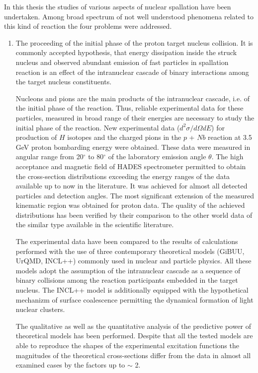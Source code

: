 In this thesis the studies of various aspects of nuclear spallation
have been undertaken. Among broad spectrum of not well understood
phenomena related to this kind of reaction the four problems were
addressed.

\begin{enumerate}
\item The proceeding of the initial phase of the proton target nucleus collision.
It is commonly accepted hypothesis, that energy dissipation inside
the struck nucleus and observed abundant emission of fast particles
in spallation reaction is an effect of the intranuclear cascade of
binary interactions among the target nucleus constituents.

\vspace{0.3cm}

Nucleons and pions are the main products of the intranuclear
cascade, i.e. of the initial phase of the reaction. Thus, reliable
experimental data for these particles, measured in broad range of
their energies  are necessary to study the initial phase of the
reaction. New experimental data ($d^2\sigma/d\Omega dE$) for
production of $H$ isotopes and the charged pions in the $p$ + $Nb$
reaction at 3.5 GeV proton bombarding energy were obtained. These
data were measured in angular range from 20$^{\circ}$ to
80$^{\circ}$ of the laboratory emission angle $\theta$. The high
acceptance and magnetic field of HADES spectrometer permitted to
obtain the cross-section distributions exceeding the energy ranges
of the data available up to now in the literature. It was achieved
for almost all detected particles and detection angles. The most
significant extension of the measured kinematic region was obtained
for proton data.
%
The quality of the achieved distributions has been verified by their
comparison to the other world data of the similar type available in
the scientific literature.

The experimental data have been compared to the results of
calculations performed with the use of three contemporary
theoretical models (GiBUU, UrQMD, INCL++) commonly used in nuclear
and particle physics. All these models adopt the assumption of the
intranuclear cascade as a sequence of binary collisions among the
reaction participants embedded in the target nucleus. The INCL++
model is additionally equipped with the hypothetical mechanizm of
surface coalescence permitting the dynamical formation of light
nuclear clusters.

The qualitative as well as the quantitative analysis of the
predictive power of theoretical models has been performed. Despite
that all the tested models are able to reproduce the shapes of the
experimental excitation functions the magnitudes of the theoretical
cross-sections differ from the data in almost all examined cases by
the factors up to $\sim$ 2.


\end{enumerate}
